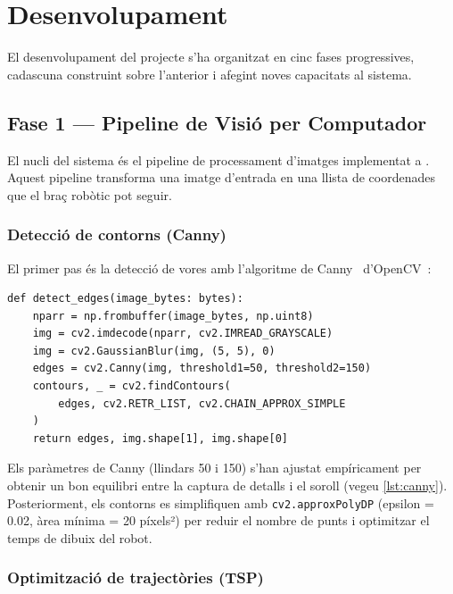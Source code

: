 \section{Desenvolupament}
\label{sec:desenvolupament}

El desenvolupament del projecte s'ha organitzat en cinc fases progressives, cadascuna construint sobre l'anterior i afegint noves capacitats al sistema.

\subsection{Fase 1 — Pipeline de Visió per Computador}

El nucli del sistema és el pipeline de processament d'imatges implementat a . Aquest pipeline transforma una imatge d'entrada en una llista de coordenades  que el braç robòtic pot seguir.

\subsubsection*{Detecció de contorns (Canny)}

El primer pas és la detecció de vores amb l'algoritme de Canny~\cite{canny} d'OpenCV~\cite{opencv}:

\begin{listing}[H]
\begin{verbatim}
def detect_edges(image_bytes: bytes):
    nparr = np.frombuffer(image_bytes, np.uint8)
    img = cv2.imdecode(nparr, cv2.IMREAD_GRAYSCALE)
    img = cv2.GaussianBlur(img, (5, 5), 0)
    edges = cv2.Canny(img, threshold1=50, threshold2=150)
    contours, _ = cv2.findContours(
        edges, cv2.RETR_LIST, cv2.CHAIN_APPROX_SIMPLE
    )
    return edges, img.shape[1], img.shape[0]
\end{verbatim}
\caption{Detecció de vores amb Canny (\texttt{vision.py})}
\label{lst:canny}
\end{listing}

Els paràmetres de Canny (llindars 50 i 150) s'han ajustat empíricament per obtenir un bon equilibri entre la captura de detalls i el soroll (vegeu \cref{lst:canny}). Posteriorment, els contorns es simplifiquen amb \texttt{cv2.approxPolyDP} (epsilon = 0.02, àrea mínima = 20 píxels²) per reduir el nombre de punts i optimitzar el temps de dibuix del robot.

\subsubsection*{Optimització de trajectòries (TSP)}

